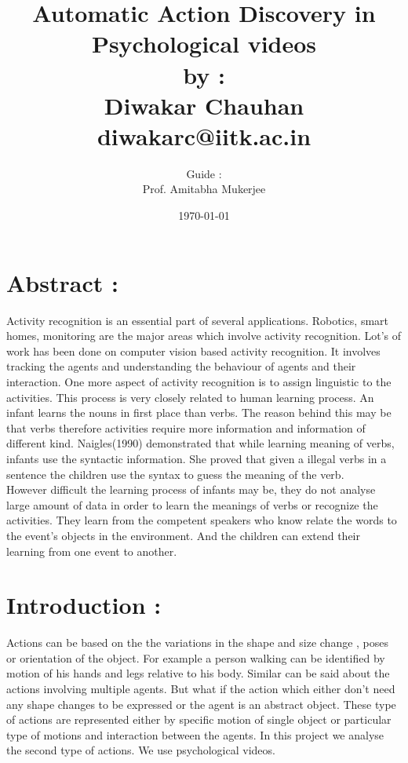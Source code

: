 \documentclass[11pt]{report}
\begin{document}
\author{ 
	    Guide :\\
	    Prof. Amitabha Mukerjee\\
	    }
\title{{\bf Automatic Action Discovery in Psychological videos}\\ \vspace{10pt}
			 { \normalsize {by : \\ Diwakar Chauhan \\ diwakarc@iitk.ac.in }}}
\date{\today}
\maketitle
\newpage
\section*{Abstract :}
Activity recognition is an essential part of several applications. Robotics, smart homes, monitoring are the major areas which involve activity recognition. Lot's of work has been done on computer vision based activity recognition. It involves tracking the agents and understanding the behaviour of agents and their interaction. One more aspect of activity recognition is to assign linguistic to the activities. This process is very closely  related to human learning process. An infant learns the nouns in first place than verbs. The reason behind this may be that verbs therefore activities require more information and information of different kind. Naigles(1990)\cite{naigles} demonstrated that while learning meaning of verbs, infants use the syntactic information. She proved that given a illegal verbs in a sentence the children use the syntax to guess the meaning of the verb. \\
\hspace*{10pt} However difficult the learning process of infants may be, they do not analyse large amount of data in order to learn the meanings of verbs or recognize the activities. They learn from the competent speakers who know relate the words to the event's objects in the environment.\cite{kerr-cohen-08_wubble-world-lang-acquisition} And the children can extend their learning from one event to another. 
\section*{Introduction : }  Actions can be based on the the variations in the shape and size change , poses\cite{pami-Ben-ArieWPR02}  or orientation of the object. For example a person walking can be identified by motion of his hands and legs relative to his body. Similar can be said about the actions involving multiple agents. But what if the action which either don't need any shape changes to be expressed or the agent is an abstract object. These type of actions are represented either by specific motion of single object or particular type of motions and interaction between the agents. In this project we analyse the second type of actions. We use psychological videos\cite{fhanimation}. \\
\end{document}
